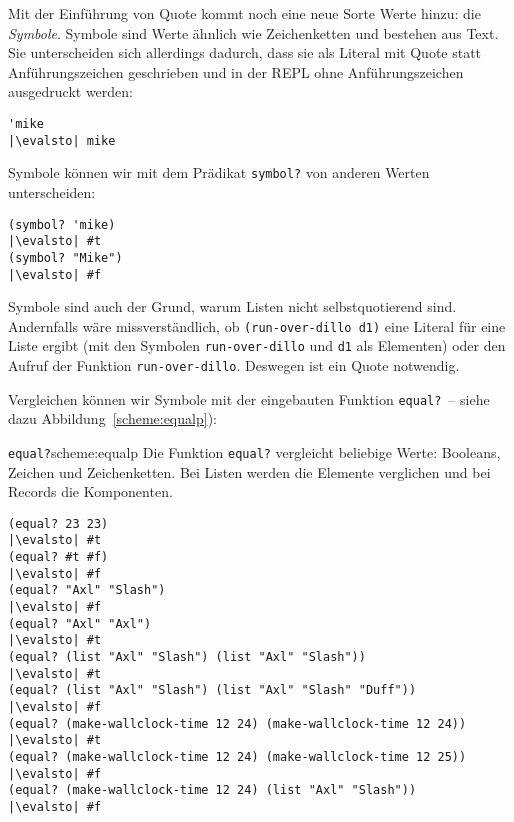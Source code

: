 Mit der Einführung von Quote kommt noch eine neue Sorte Werte
hinzu: die \textit{Symbole}.  Symbole sind Werte ähnlich wie Zeichenketten und
bestehen aus Text.  Sie unterscheiden sich allerdings dadurch, dass sie
als Literal mit Quote statt Anführungszeichen geschrieben und in der REPL ohne
Anführungszeichen ausgedruckt werden:
%
\begin{lstlisting}
'mike
|\evalsto| mike
\end{lstlisting}
%
Symbole können wir mit dem Prädikat
\lstinline{symbol?} von anderen Werten
unterscheiden:
%
\begin{lstlisting}
(symbol? 'mike)
|\evalsto| #t
(symbol? "Mike")
|\evalsto| #f
\end{lstlisting}
%
Symbole sind auch der Grund, warum Listen nicht selbstquotierend sind.
Andernfalls wäre
missverständlich, ob  \lstinline{(run-over-dillo d1)} eine Literal für
eine Liste
ergibt (mit den Symbolen \lstinline{run-over-dillo} und \lstinline{d1}
als Elementen) oder den Aufruf der Funktion
\lstinline{run-over-dillo}.  Deswegen ist ein Quote notwendig.

Vergleichen können wir Symbole mit der eingebauten Funktion
\lstinline{equal?}~-- siehe dazu Abbildung~\ref{scheme:equalp}):
\begin{feature}{\texttt{equal?}}{scheme:equalp}
  Die Funktion \texttt{equal?} vergleicht beliebige Werte:
  Booleans, Zeichen und Zeichenketten.
  Bei Listen werden die Elemente verglichen und bei Records die Komponenten. 
%
\begin{lstlisting}
(equal? 23 23)
|\evalsto| #t
(equal? #t #f)
|\evalsto| #f
(equal? "Axl" "Slash")
|\evalsto| #f
(equal? "Axl" "Axl")
|\evalsto| #t
(equal? (list "Axl" "Slash") (list "Axl" "Slash"))
|\evalsto| #t
(equal? (list "Axl" "Slash") (list "Axl" "Slash" "Duff"))
|\evalsto| #f
(equal? (make-wallclock-time 12 24) (make-wallclock-time 12 24))
|\evalsto| #t
(equal? (make-wallclock-time 12 24) (make-wallclock-time 12 25))
|\evalsto| #f
(equal? (make-wallclock-time 12 24) (list "Axl" "Slash"))
|\evalsto| #f
\end{lstlisting}
\end{feature}

